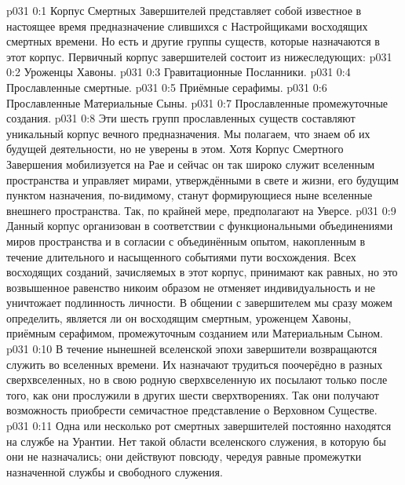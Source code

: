 \author{Божественный Советник и Не Имеющий Имени и Номера}
\vs p031 0:1 Корпус Смертных Завершителей представляет собой известное в настоящее время предназначение слившихся с Настройщиками восходящих смертных времени. Но есть и другие группы существ, которые назначаются в этот корпус. Первичный корпус завершителей состоит из нижеследующих:
\vs p031 0:2 Уроженцы Хавоны.
\vs p031 0:3 Гравитационные Посланники.
\vs p031 0:4 Прославленные смертные.
\vs p031 0:5 Приёмные серафимы.
\vs p031 0:6 Прославленные Материальные Сыны.
\vs p031 0:7 Прославленные промежуточные создания.
\vs p031 0:8 \pc Эти шесть групп прославленных существ составляют уникальный корпус вечного предназначения. Мы полагаем, что знаем об их будущей деятельности, но не уверены в этом. Хотя Корпус Смертного Завершения мобилизуется на Рае и сейчас он так широко служит вселенным пространства и управляет мирами, утверждёнными в свете и жизни, его будущим пунктом назначения, по\hyp{}видимому, станут формирующиеся ныне вселенные внешнего пространства. Так, по крайней мере, предполагают на Уверсе.
\vs p031 0:9 Данный корпус организован в соответствии с функциональными объединениями миров пространства и в согласии с объединённым опытом, накопленным в течение длительного и насыщенного событиями пути восхождения. Всех восходящих созданий, зачисляемых в этот корпус, принимают как равных, но это возвышенное равенство никоим образом не отменяет индивидуальность и не уничтожает подлинность личности. В общении с завершителем мы сразу можем определить, является ли он восходящим смертным, уроженцем Хавоны, приёмным серафимом, промежуточным созданием или Материальным Сыном.
\vs p031 0:10 В течение нынешней вселенской эпохи завершители возвращаются служить во вселенных времени. Их назначают трудиться поочерёдно в разных сверхвселенных, но в свою родную сверхвселенную их посылают только после того, как они прослужили в других шести сверхтворениях. Так они получают возможность приобрести семичастное представление о Верховном Существе.
\vs p031 0:11 Одна или несколько рот смертных завершителей постоянно находятся на службе на Урантии. Нет такой области вселенского служения, в которую бы они не назначались; они действуют повсюду, чередуя равные промежутки назначенной службы и свободного служения.
